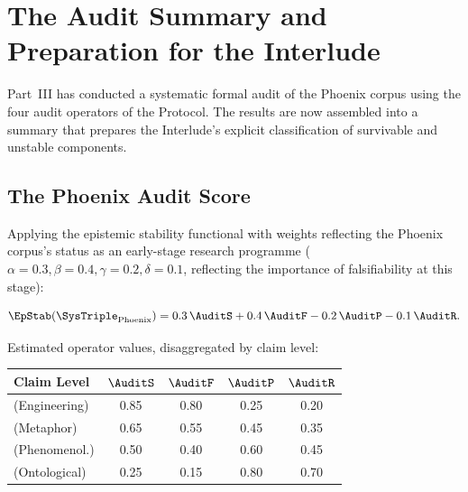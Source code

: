 
\chapter{The Audit Summary and Preparation for the Interlude}
\label{ch:audit-summary}


\noindent
Part~III has conducted a systematic formal audit of
the Phoenix corpus using the four audit operators
of the \Ortyx{} Protocol. The results are now assembled
into a summary that prepares the Interlude's explicit
classification of survivable and unstable components.

\section{The Phoenix Audit Score}
\label{sec:phoenix-score}

Applying the epistemic stability functional with weights
reflecting the Phoenix corpus's status as an early-stage
research programme ($\alpha = 0.3, \beta = 0.4,
\gamma = 0.2, \delta = 0.1$, reflecting the
importance of falsifiability at this stage):

\[
  \EpStab(\SysTriple_{\mathrm{Phoenix}})
  = 0.3\,\AuditS + 0.4\,\AuditF
  - 0.2\,\AuditP - 0.1\,\AuditR.
\]

Estimated operator values, disaggregated by claim level:

\begin{center}
\begin{tabular}{lcccc}
\toprule
Claim Level & $\AuditS$ & $\AuditF$ & $\AuditP$ & $\AuditR$ \\
\midrule
\LevelI{} (Engineering) & 0.85 & 0.80 & 0.25 & 0.20 \\
\LevelII{} (Metaphor)   & 0.65 & 0.55 & 0.45 & 0.35 \\
\LevelIII{} (Phenomenol.) & 0.50 & 0.40 & 0.60 & 0.45 \\
\LevelIV{} (Ontological) & 0.25 & 0.15 & 0.80 & 0.70 \\
\bottomrule
\end{tabular}
\end{center}

